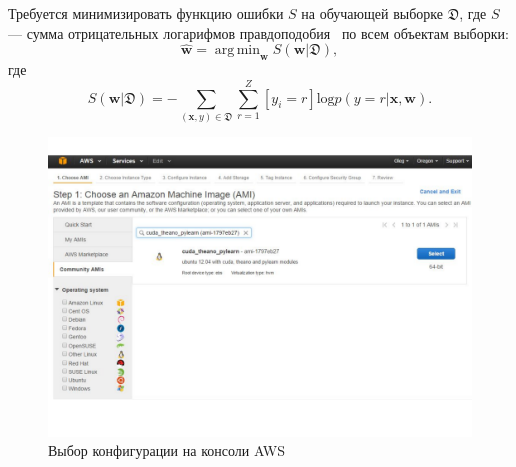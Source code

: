 \documentclass[12pt,notitlepage]{article}
\DeclareMathOperator*{\argmin}{arg\,min}
\begin{document}
Требуется минимизировать функцию ошибки $S$ на обучающей выборке $\mathfrak{D}$,
где $S$ --- сумма отрицательных логарифмов правдоподобия~\cite{nnl} по всем объектам выборки:
\[
 \hat{\mathbf{w}} = \argmin_\mathbf{w} S(\mathbf{w}|\mathfrak{D}),
\]
где
\[
 S(\mathbf{w}|\mathfrak{D}) = -\sum_{(\mathbf{x},y) \in \mathfrak{D} } \sum_{r=1}^Z [y_i = r] \text{log} p(y=r|\mathbf{x},\mathbf{w}).
\]

\begin{figure}[h!]
 \centering
  \includegraphics[totalheight=12	cm]{ami.pdf}
 \caption{Выбор конфигурации на консоли AWS}
 \label{fig:ami}
\end{figure}
\end{document}
